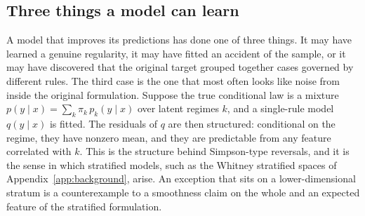 \documentclass[11pt,a4paper]{article}
\theoremstyle{definition}
\theoremstyle{remark}
\begin{document}
\subsection{Three things a model can learn}

A model that improves its predictions has done one of three things. It may
have learned a genuine regularity, it may have fitted an accident of the
sample, or it may have discovered that the original target grouped
together cases governed by different rules. The third case is the one
that most often looks like noise from inside the original formulation.
Suppose the true conditional law is a mixture
$p(y\mid x)=\sum_k\pi_k\,p_k(y\mid x)$ over latent regimes $k$, and a
single-rule model $q(y\mid x)$ is fitted. The residuals of $q$ are then
structured: conditional on the regime, they have nonzero mean, and they
are predictable from any feature correlated with $k$. This is the
structure behind Simpson-type reversals, and it is the sense in which
stratified models, such as the Whitney stratified spaces of
Appendix~\ref{app:background}, arise. An exception that sits on a
lower-dimensional stratum is a counterexample to a smoothness claim on the
whole and an expected feature of the stratified formulation.
\end{document}
